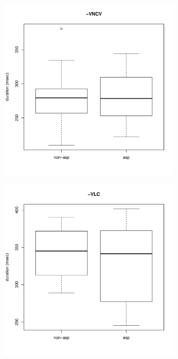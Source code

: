 \documentclass[11pt,a4paper,openany]{memoir}\usepackage[]{graphicx}\usepackage[]{color}
\newenvironment{knitrout}{}{} %
\begin{document}
\begin{figure}
\begin{subfigure}{.5\textwidth}
\begin{knitrout}
\end{knitrout}
\end{subfigure}
\begin{subfigure}{.5\textwidth}
\centering
\begin{knitrout}
\color{fgcolor}
\includegraphics[width=\textwidth]{img/di-nas-vor-1} 

\end{knitrout}
\end{subfigure}
\begin{subfigure}{.5\textwidth}
\centering
\begin{knitrout}
\color{fgcolor}
\includegraphics[width=\textwidth]{img/mono-lat-vor-1} 


\end{knitrout}
\end{subfigure}
\end{figure}
\end{document}
